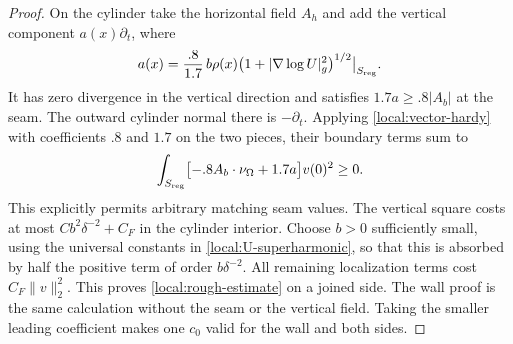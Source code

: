 \documentclass[11pt]{article}
\numberwithin{equation}{section}
\theoremstyle{definition}
\theoremstyle{remark}
\begin{document}
\begin{proof}
On the cylinder take the horizontal field $A_h$ and add the vertical
component $a(x)\partial_t$, where
\[
 a(x)=\frac{.8}{1.7}\,b\rho(x)
               \bigl(1+|\nabla\log U|_g^2\bigr)^{1/2}
                 \big|_{S_{\rm reg}}.
\]
It has zero divergence in the vertical direction and satisfies
$1.7a\ge .8|A_b|$ at the seam.  The outward cylinder normal there is
$-\partial_t$.  Applying \eqref{local:vector-hardy} with coefficients
$.8$ and $1.7$ on the two pieces, their boundary terms sum to
\[
 \int_{S_{\rm reg}}
       \bigl[-.8 A_b\cdot\nu_\Omega+1.7a\bigr]v(0)^2\ge0.
\]
This explicitly permits arbitrary matching seam values.  The
vertical square costs at most $C b^2\delta^{-2}+C_F$ in the
cylinder interior.  Choose $b>0$ sufficiently small, using the
universal constants in \eqref{local:U-superharmonic}, so that this
is absorbed by half the positive term of order $b\delta^{-2}$.
All remaining localization terms cost $C_F\|v\|_2^2$.
This proves \eqref{local:rough-estimate} on a joined side.  The
wall proof is the same calculation without the seam or the vertical
field.  Taking the smaller leading coefficient makes one $c_0$
valid for the wall and both sides.
\end{proof}
\end{document}

